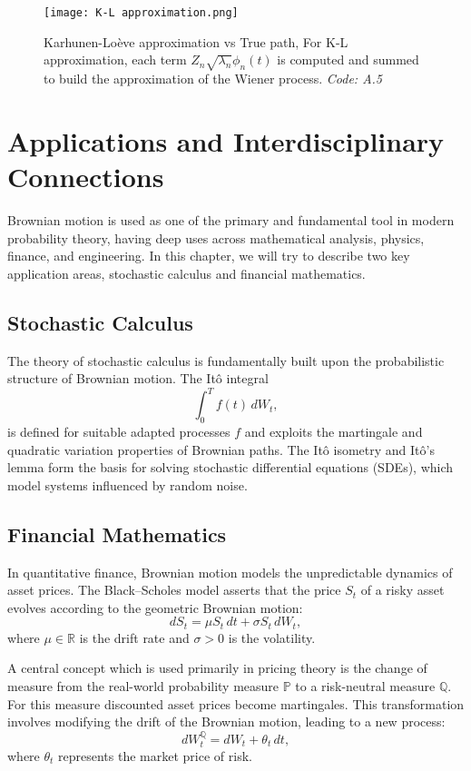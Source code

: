 \documentclass[12pt]{report}
\begin{document}
\begin{figure}[H]
    \centering
    \texttt{[image: K-L approximation.png]}
    \caption{Karhunen-Loève approximation vs True path, For K-L approximation, each term $Z_n\sqrt{\lambda_n}\phi_n(t)$ is computed and summed to build the approximation of the Wiener process. \textit{Code: A.5}}
    \label{fig:kl}
\end{figure}

\chapter{Applications and Interdisciplinary Connections}

Brownian motion is used as one of the primary and fundamental tool in modern probability theory, having deep uses across mathematical analysis, physics, finance, and engineering. In this chapter, we will try to describe two key application areas, stochastic calculus and financial mathematics.

\section{Stochastic Calculus}

The theory of stochastic calculus is fundamentally built upon the probabilistic structure of Brownian motion. The Itô integral
\[
\int_0^T f(t) \, dW_t,
\]
is defined for suitable adapted processes \( f \) and exploits the martingale and quadratic variation properties of Brownian paths. The Itô isometry and Itô’s lemma form the basis for solving stochastic differential equations (SDEs), which model systems influenced by random noise.

\section{Financial Mathematics}

In quantitative finance, Brownian motion models the unpredictable dynamics of asset prices. The Black–Scholes model asserts that the price \( S_t \) of a risky asset evolves according to the geometric Brownian motion:
\[
dS_t = \mu S_t \, dt + \sigma S_t \, dW_t,
\]
where \( \mu \in \mathbb{R} \) is the drift rate and \( \sigma > 0 \) is the volatility.

A central concept which is used primarily in pricing theory is the change of measure from the real-world probability measure \( \mathbb{P} \) to a risk-neutral measure \( \mathbb{Q} \). For this measure discounted asset prices become martingales. This transformation involves modifying the drift of the Brownian motion, leading to a new process:
\[
dW_t^\mathbb{Q} = dW_t + \theta_t \, dt,
\]
where \( \theta_t \) represents the market price of risk.
\end{document}

